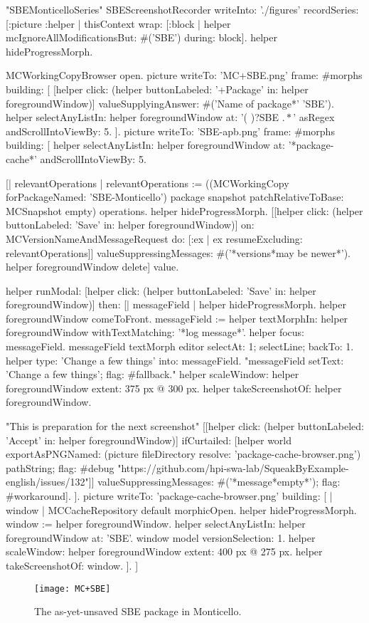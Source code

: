 \documentclass[a4paper,10pt,twoside]{book}
\begin{document}
\begin{ExecuteSmalltalkScript}
"SBEMonticelloSeries"
SBEScreenshotRecorder writeInto: './figures' recordSeries: [:picture :helper |
	thisContext wrap: [:block | helper mcIgnoreAllModificationsBut: #('SBE') during: block].
	helper hideProgressMorph.

	MCWorkingCopyBrowser open.
	picture writeTo: 'MC+SBE.png' frame: #morphs building: [
		[helper click: (helper buttonLabeled: '+Package' in: helper foregroundWindow)]
			valueSupplyingAnswer: #('Name of package*' 'SBE').
		helper selectAnyListIn: helper foregroundWindow at: '(\* )?SBE \(.*\)' asRegex andScrollIntoViewBy: 5.
	].
	picture writeTo: 'SBE-apb.png' frame: #morphs building: [
		helper selectAnyListIn: helper foregroundWindow at: '*package-cache*' andScrollIntoViewBy: 5.

		[| relevantOperations |
		relevantOperations := ((MCWorkingCopy forPackageNamed: 'SBE-Monticello') package snapshot
			patchRelativeToBase: MCSnapshot empty) operations.
		helper hideProgressMorph.
		[[helper click: (helper buttonLabeled: 'Save' in: helper foregroundWindow)]
			on: MCVersionNameAndMessageRequest
			do: [:ex | ex resumeExcluding: relevantOperations]]
				valueSuppressingMessages: #('*versions*may be newer*').
		helper foregroundWindow delete] value.

		helper
			runModal: [helper click: (helper buttonLabeled: 'Save' in: helper foregroundWindow)]
			then: [| messageField |
				helper hideProgressMorph.
				helper foregroundWindow comeToFront.
				messageField := helper textMorphIn: helper foregroundWindow withTextMatching: '*log message*'.
				helper focus: messageField.
				messageField textMorph editor selectAt: 1; selectLine; backTo: 1.
				helper type: 'Change a few things' into: messageField.
				"messageField setText: 'Change a few things'; flag: #fallback."
				helper scaleWindow: helper foregroundWindow extent: 375 px @ 300 px.
				helper takeScreenshotOf: helper foregroundWindow.

				"This is preparation for the next screenshot"
					[[helper click: (helper buttonLabeled: 'Accept' in: helper foregroundWindow)]
							ifCurtailed: [helper world exportAsPNGNamed: (picture fileDirectory resolve: 'package-cache-browser.png') pathString; flag: #debug "https://github.com/hpi-swa-lab/SqueakByExample-english/issues/132"]]
						valueSuppressingMessages: #('*message*empty*');
						flag: #workaround].
	].
	picture writeTo: 'package-cache-browser.png' building: [
		| window |
		MCCacheRepository default morphicOpen.
		helper hideProgressMorph.
		window := helper foregroundWindow.
		helper selectAnyListIn: helper foregroundWindow at: 'SBE'.
		window model versionSelection: 1.
		helper scaleWindow: helper foregroundWindow extent: 400 px @ 275 px.
		helper takeScreenshotOf: window.
	].
]
\end{ExecuteSmalltalkScript}
\begin{figure}[tbp]
	\begin{center}
		\texttt{[image: MC+SBE]}
	\end{center}
	\caption{The as-yet-unsaved SBE package in Monticello.}
	\label{fig:MC+SBE}
\end{figure}
\end{document}
